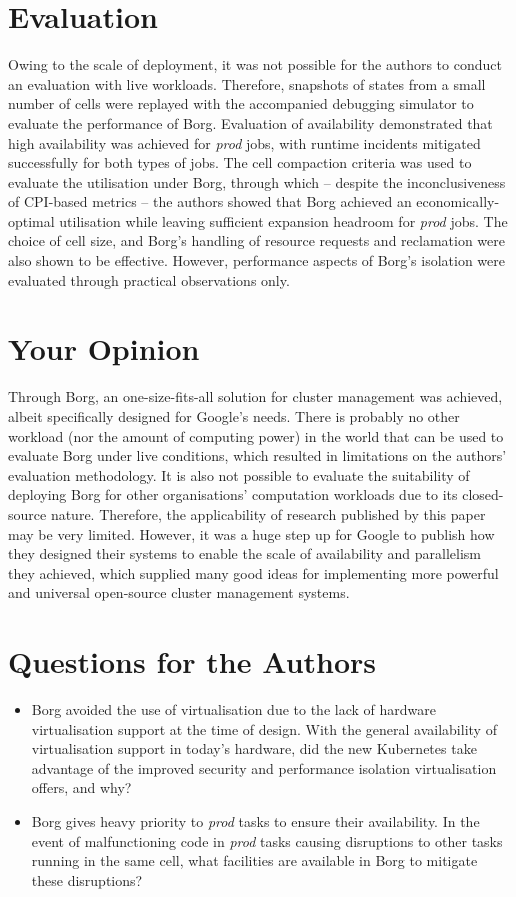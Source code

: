 \documentclass[11pt]{article}
\begin{document}
\section*{Evaluation}

Owing to the scale of deployment, it was not possible for the authors to conduct an evaluation with live workloads. Therefore, snapshots of states from a small number of cells were replayed with the accompanied debugging simulator to evaluate the performance of Borg. Evaluation of availability demonstrated that high availability was achieved for \emph{prod} jobs, with runtime incidents mitigated successfully for both types of jobs. The cell compaction criteria was used to evaluate the utilisation under Borg, through which -- despite the inconclusiveness of CPI-based metrics -- the authors showed that Borg achieved an economically-optimal utilisation while leaving sufficient expansion headroom for \emph{prod} jobs. The choice of cell size, and Borg's handling of resource requests and reclamation were also shown to be effective. However, performance aspects of Borg's isolation were evaluated through practical observations only.

\section*{Your Opinion}

Through Borg, an one-size-fits-all solution for cluster management was achieved, albeit specifically designed for Google's needs. There is probably no other workload (nor the amount of computing power) in the world that can be used to evaluate Borg under live conditions, which resulted in limitations on the authors' evaluation methodology. It is also not possible to evaluate the suitability of deploying Borg for other organisations' computation workloads due to its closed-source nature. Therefore, the applicability of research published by this paper may be very limited. However, it was a huge step up for Google to publish how they designed their systems to enable the scale of availability and parallelism they achieved, which supplied many good ideas for implementing more powerful and universal open-source cluster management systems.

\section*{Questions for the Authors}

\begin{itemize}
	\item Borg avoided the use of virtualisation due to the lack of hardware virtualisation support at the time of design. With the general availability of virtualisation support in today's hardware, did the new Kubernetes take advantage of the improved security and performance isolation virtualisation offers, and why?
	\item Borg gives heavy priority to \emph{prod} tasks to ensure their availability. In the event of malfunctioning code in \emph{prod} tasks causing disruptions to other tasks running in the same cell, what facilities are available in Borg to mitigate these disruptions?
\end{itemize}


\footnotesize{}
\end{document}
